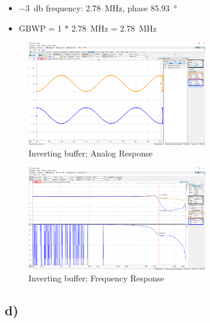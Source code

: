 \documentclass{article}
\begin{document}
	\begin{itemize}
		\item \SI{-3}{\decibel} frequency: \SI{2.78}{\mega\hertz}, phase \SI{85.93}{\degree}
		\item GBWP = 1 * \SI{2.78}{\mega\hertz} = \SI{2.78}{\mega\hertz}
	\end{itemize}
	
	\begin{figure}[H]
	    \centering
	    \includegraphics[width=0.7\textwidth]{2c-1}
	    \caption{Inverting buffer; Analog Response}
	\end{figure}

	\begin{figure}[H]
	    \centering
	    \includegraphics[width=0.7\textwidth]{2c-2}
	    \caption{Inverting buffer; Frequency Response}
	\end{figure}
	
	\subsection*{d)}
	
\end{document}
